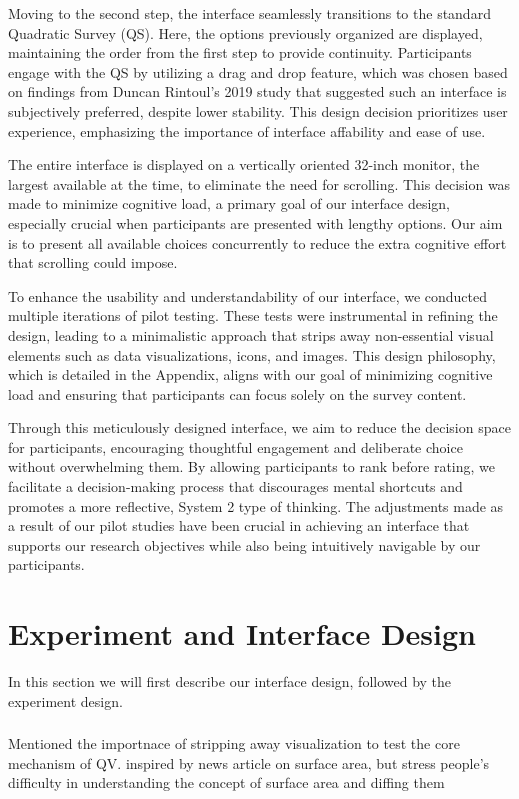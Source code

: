 Moving to the second step, the interface seamlessly transitions to the standard Quadratic Survey (QS). Here, the options previously organized are displayed, maintaining the order from the first step to provide continuity. Participants engage with the QS by utilizing a drag and drop feature, which was chosen based on findings from Duncan Rintoul's 2019 study that suggested such an interface is subjectively preferred, despite lower stability. This design decision prioritizes user experience, emphasizing the importance of interface affability and ease of use.

The entire interface is displayed on a vertically oriented 32-inch monitor, the largest available at the time, to eliminate the need for scrolling. This decision was made to minimize cognitive load, a primary goal of our interface design, especially crucial when participants are presented with lengthy options. Our aim is to present all available choices concurrently to reduce the extra cognitive effort that scrolling could impose.

To enhance the usability and understandability of our interface, we conducted multiple iterations of pilot testing. These tests were instrumental in refining the design, leading to a minimalistic approach that strips away non-essential visual elements such as data visualizations, icons, and images. This design philosophy, which is detailed in the Appendix, aligns with our goal of minimizing cognitive load and ensuring that participants can focus solely on the survey content.

Through this meticulously designed interface, we aim to reduce the decision space for participants, encouraging thoughtful engagement and deliberate choice without overwhelming them. By allowing participants to rank before rating, we facilitate a decision-making process that discourages mental shortcuts and promotes a more reflective, System 2 type of thinking. The adjustments made as a result of our pilot studies have been crucial in achieving an interface that supports our research objectives while also being intuitively navigable by our participants.


\section{Experiment and Interface Design}


In this section we will first describe our interface design, followed by the experiment design.
\subsubsection{}
Mentioned the importnace of stripping away visualization to test the core mechanism of QV.
inspired by news article on surface area, but stress people's difficulty in understanding the concept of surface area and diffing them





